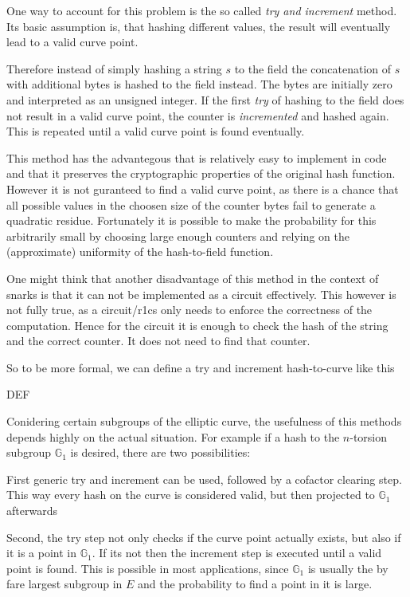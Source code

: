 One way to account for this problem is the so called \textit{try and increment} method. Its basic assumption is, that hashing different values, the result will eventually lead to a valid curve point. 

Therefore instead of simply hashing a string $s$ to the field the concatenation of $s$ with additional bytes is hashed to the field instead. The bytes are initially zero and interpreted as an unsigned integer. If the first \textit{try} of hashing to the field does not result in a valid curve point, the counter is \textit{incremented} and hashed again. This is repeated until a valid curve point is found eventually.

This method has the advantegous that is relatively easy to implement in code and that it preserves the cryptographic properties of the original hash function. However it is not guranteed to find a valid curve point, as there is a chance that all possible values in the choosen size of the counter bytes fail to generate a quadratic residue. Fortunately it is possible to make the probability for this arbitrarily small by choosing large enough counters and relying on the (approximate) uniformity of the hash-to-field function. 

One might think that another disadvantage of this method in the context of snarks is that it can not be implemented as a circuit effectively. This however is not fully true, as a circuit/r1cs only needs to enforce the correctness of the computation. Hence for the circuit it is enough to check the hash of the string and the correct counter. It does not need to find that counter.

So to be more formal, we can define a try and increment hash-to-curve like this

DEF


Conidering certain subgroups of the elliptic curve, the usefulness of this methods depends highly on the actual situation. For example if a hash to the $n$-torsion subgroup $\mathbb{G}_1$ is desired, there are two possibilities: 

First generic try and increment can be used, followed by a cofactor clearing step. This way every hash on the curve is considered valid, but then projected to $\mathbb{G}_1$ afterwards 

Second, the try step not only checks if the curve point actually exists, but also if it is a point in $\mathbb{G}_1$. If its not then the increment step is executed until a valid point is found. This is possible in most applications, since $\mathbb{G}_1$ is usually the by fare largest subgroup in $E$ and the probability to find a point in it is large.

